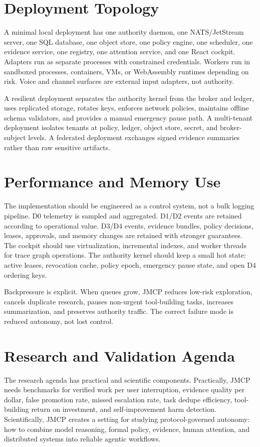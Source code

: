 \documentclass[journal,onecolumn]{IEEEtran}
\begin{document}
\section{Deployment Topology}
A minimal local deployment has one authority daemon, one NATS/JetStream server, one SQL database, one object store, one policy engine, one scheduler, one evidence service, one registry, one attention service, and one React cockpit. Adapters run as separate processes with constrained credentials. Workers run in sandboxed processes, containers, VMs, or WebAssembly runtimes depending on risk. Voice and channel surfaces are external input adapters, not authority.

A resilient deployment separates the authority kernel from the broker and ledger, uses replicated storage, rotates keys, enforces network policies, maintains offline schema validators, and provides a manual emergency pause path. A multi-tenant deployment isolates tenants at policy, ledger, object store, secret, and broker-subject levels. A federated deployment exchanges signed evidence summaries rather than raw sensitive artifacts.

\section{Performance and Memory Use}
The implementation should be engineered as a control system, not a bulk logging pipeline. D0 telemetry is sampled and aggregated. D1/D2 events are retained according to operational value. D3/D4 events, evidence bundles, policy decisions, leases, approvals, and memory changes are retained with stronger guarantees. The cockpit should use virtualization, incremental indexes, and worker threads for trace graph operations. The authority kernel should keep a small hot state: active leases, revocation cache, policy epoch, emergency pause state, and open D4 ordering keys.

Backpressure is explicit. When queues grow, JMCP reduces low-risk exploration, cancels duplicate research, pauses non-urgent tool-building tasks, increases summarization, and preserves authority traffic. The correct failure mode is reduced autonomy, not lost control.

\section{Research and Validation Agenda}
The research agenda has practical and scientific components. Practically, JMCP needs benchmarks for verified work per user interruption, evidence quality per dollar, false promotion rate, missed escalation rate, task dedupe efficiency, tool-building return on investment, and self-improvement harm detection. Scientifically, JMCP creates a setting for studying protocol-governed autonomy: how to combine model reasoning, formal policy, evidence, human attention, and distributed systems into reliable agentic workflows.
\end{document}
